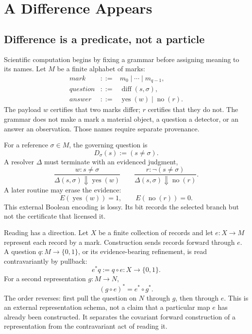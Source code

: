 \chapter{A Difference Appears}

\section{Difference is a predicate, not a particle}

Scientific computation begins by fixing a grammar before assigning meaning to its names.  Let \(M\) be a finite
alphabet of marks:
\[
\begin{array}{rcl}
\textit{mark}&::=&m_0\mid\cdots\mid m_{q-1},\\
\textit{question}&::=&\operatorname{diff}(s,\sigma),\\
\textit{answer}&::=&\operatorname{yes}(w)\mid\operatorname{no}(r).
\end{array}
\]
The payload \(w\) certifies that two marks differ; \(r\) certifies that they do not.  The grammar does not make a mark
a material object, a question a detector, or an answer an observation.  Those names require separate provenance.

For a reference \(\sigma\in M\), the governing question is
\[
        D_\sigma(s):=(s\ne\sigma).
\]
A resolver \(\Delta\) must terminate with an evidenced judgment,
\[
 \frac{w:s\ne\sigma}{\Delta(s,\sigma)\Downarrow\operatorname{yes}(w)}
 \qquad
 \frac{r:\neg(s\ne\sigma)}{\Delta(s,\sigma)\Downarrow\operatorname{no}(r)}.
\]
A later routine may erase the evidence:
\[
 E(\operatorname{yes}(w))=1,\qquad E(\operatorname{no}(r))=0.
\]
This external Boolean encoding is lossy.  Its bit records the selected branch but not the certificate that licensed it.

Reading has a direction.  Let \(X\) be a finite collection of records and let
\(e:X\to M\) represent each record by a mark.  Construction sends records forward through \(e\).  A question
\(q:M\to\{0,1\}\), or its evidence-bearing refinement, is read contravariantly by pullback:
\[
        e^*q:=q\circ e:X\to\{0,1\}.
\]
For a second representation \(g:M\to N\),
\[
        (g\circ e)^*=e^*\circ g^*.
\]
The order reverses: first pull the question on \(N\) through \(g\), then through \(e\).  This is an external
representation schema, not a claim that a particular map \(e\) has already been constructed.  It separates the
covariant forward construction of a representation from the contravariant act of reading it.

